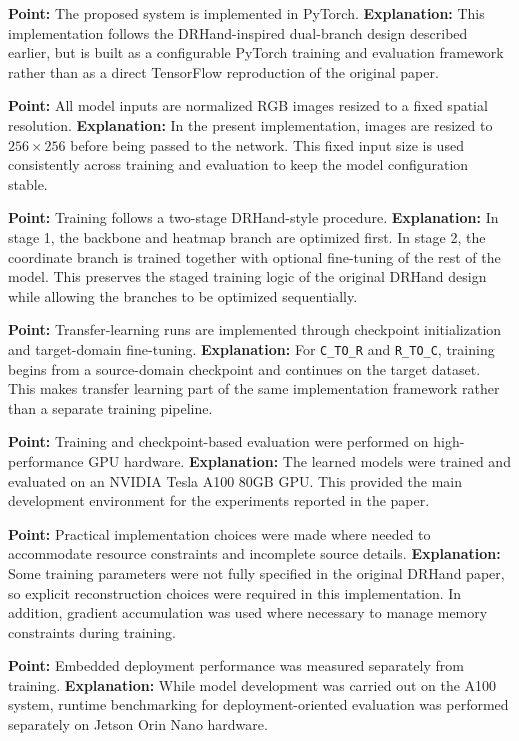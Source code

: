 \documentclass[10pt,letterpaper]{article}
\begin{document}
\noindent\textbf{Point:} The proposed system is implemented in PyTorch.  
\textbf{Explanation:} This implementation follows the DRHand-inspired dual-branch design described earlier, but is built as a configurable PyTorch training and evaluation framework rather than as a direct TensorFlow reproduction of the original paper.

\medskip
\noindent\textbf{Point:} All model inputs are normalized RGB images resized to a fixed spatial resolution.  
\textbf{Explanation:} In the present implementation, images are resized to $256 \times 256$ before being passed to the network. This fixed input size is used consistently across training and evaluation to keep the model configuration stable.

\medskip
\noindent\textbf{Point:} Training follows a two-stage DRHand-style procedure.  
\textbf{Explanation:} In stage 1, the backbone and heatmap branch are optimized first. In stage 2, the coordinate branch is trained together with optional fine-tuning of the rest of the model. This preserves the staged training logic of the original DRHand design while allowing the branches to be optimized sequentially.

\medskip
\noindent\textbf{Point:} Transfer-learning runs are implemented through checkpoint initialization and target-domain fine-tuning.  
\textbf{Explanation:} For \texttt{C\_TO\_R} and \texttt{R\_TO\_C}, training begins from a source-domain checkpoint and continues on the target dataset. This makes transfer learning part of the same implementation framework rather than a separate training pipeline.

\medskip
\noindent\textbf{Point:} Training and checkpoint-based evaluation were performed on high-performance GPU hardware.  
\textbf{Explanation:} The learned models were trained and evaluated on an NVIDIA Tesla A100 80GB GPU. This provided the main development environment for the experiments reported in the paper.

\medskip
\noindent\textbf{Point:} Practical implementation choices were made where needed to accommodate resource constraints and incomplete source details.  
\textbf{Explanation:} Some training parameters were not fully specified in the original DRHand paper, so explicit reconstruction choices were required in this implementation. In addition, gradient accumulation was used where necessary to manage memory constraints during training.

\medskip
\noindent\textbf{Point:} Embedded deployment performance was measured separately from training.  
\textbf{Explanation:} While model development was carried out on the A100 system, runtime benchmarking for deployment-oriented evaluation was performed separately on Jetson Orin Nano hardware.
\end{document}
